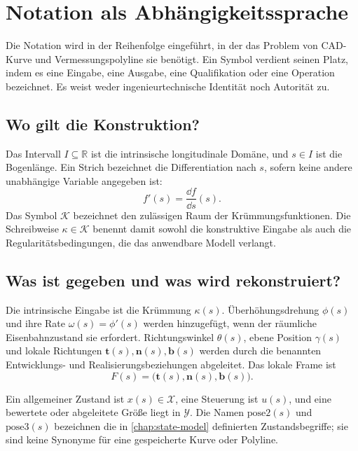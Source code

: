 
\chapter{Notation als Abhängigkeitssprache}
\label{chap:notation}

Die Notation wird in der Reihenfolge eingeführt, in der das Problem von
CAD-Kurve und Vermessungspolyline sie benötigt. Ein Symbol verdient seinen
Platz, indem es eine Eingabe, eine Ausgabe, eine Qualifikation oder eine
Operation bezeichnet. Es weist weder ingenieurtechnische Identität noch
Autorität zu.

\section{Wo gilt die Konstruktion?}

Das Intervall \(I\subseteq\mathbb{R}\) ist die intrinsische longitudinale
Domäne, und \(s\in I\) ist die Bogenlänge. Ein Strich bezeichnet die
Differentiation nach \(s\), sofern keine andere unabhängige Variable angegeben
ist:
\[
f'(s)=\frac{\dd f}{\dd s}(s).
\]
Das Symbol \(\mathcal K\) bezeichnet den zulässigen Raum der
Krümmungsfunktionen. Die Schreibweise \(\kappa\in\mathcal K\) benennt damit
sowohl die konstruktive Eingabe als auch die Regularitätsbedingungen, die das
anwendbare Modell verlangt.

\section{Was ist gegeben und was wird rekonstruiert?}

Die intrinsische Eingabe ist die Krümmung \(\kappa(s)\). Überhöhungsdrehung
\(\phi(s)\) und ihre Rate \(\omega(s)=\phi'(s)\) werden hinzugefügt, wenn der
räumliche Eisenbahnzustand sie erfordert. Richtungswinkel \(\theta(s)\),
ebene Position \(\gamma(s)\) und lokale Richtungen
\(\mathbf t(s),\mathbf n(s),\mathbf b(s)\) werden durch die benannten
Entwicklungs- und Realisierungsbeziehungen abgeleitet. Das lokale Frame ist
\[
F(s)=\bigl(\mathbf t(s),\mathbf n(s),\mathbf b(s)\bigr).
\]

Ein allgemeiner Zustand ist \(x(s)\in\mathcal X\), eine Steuerung ist
\(u(s)\), und eine bewertete oder abgeleitete Größe liegt in \(\mathcal Y\).
Die Namen \(\mathrm{pose2}(s)\) und \(\mathrm{pose3}(s)\) bezeichnen die in
\cref{chap:state-model} definierten Zustandsbegriffe; sie sind keine Synonyme
für eine gespeicherte Kurve oder Polyline.

